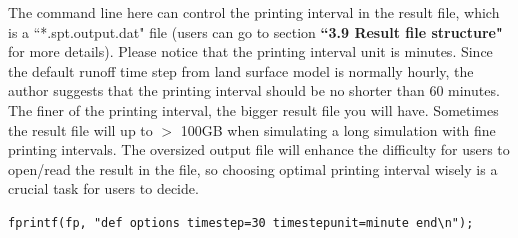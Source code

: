\documentclass[12pt, letterpaper]{article}
\begin{document}
\begin{appendices}
\begin{flushleft}
The command line here can control the printing interval in the result file, which is a ``*.spt.output.dat" file (users can go to section \textbf{``3.9 Result file structure"} for more details). Please notice that the printing interval unit is minutes. Since the default runoff time step from land surface model is normally hourly, the author suggests that the printing interval should be no shorter than 60 minutes. The finer of the printing interval, the bigger result file you will have. Sometimes the result file will up to $>$ 100GB when simulating a long simulation with fine printing intervals. 
The oversized output file will enhance the difficulty for users to open/read the result in the file, so choosing optimal printing interval wisely is a crucial task for users to decide.
\newline
{}
\lstset{showstringspaces=false}

\begin{lstlisting}[frame=single,basicstyle=\small]
fprintf(fp, "def options timestep=30 timestepunit=minute end\n");
\end{lstlisting}


\end{flushleft}
\end{appendices}
\end{document}
